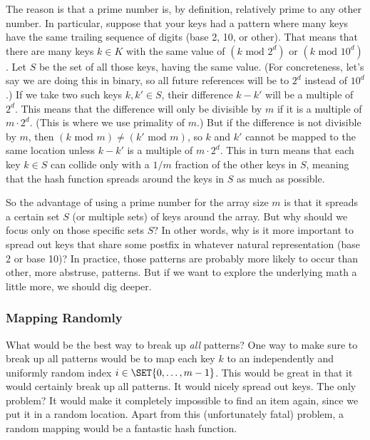 The reason is that a prime
number is, by definition, relatively prime to any other number. 
In particular, suppose that your keys had a pattern where many keys
have the same trailing sequence of digits (base 2, 10, or
other). That means that there are many keys $k \in K$ with the same
value of $(k \text{ mod } 2^d)$ or $(k \text{ mod } 10^d)$.
Let $S$ be the set of all those keys, having the same value.
(For concreteness, let's say we are doing this in binary, so all
future references will be to $2^d$ instead of $10^d$.)
If we take two such keys $k, k' \in S$, their difference $k-k'$ will
be a multiple of $2^d$. 
This means that the difference will only be divisible by $m$ if it is
a multiple of $m \cdot 2^d$. (This is where we use primality of $m$.)
But if the difference is not divisible by $m$, then 
$(k \text{ mod } m) \neq (k' \text{ mod } m)$, so $k$ and $k'$ cannot be
mapped to the same location unless $k - k'$ is a multiple of 
$m \cdot 2^d$. This in turn means that each key $k \in S$ can collide 
only with a $1/m$ fraction of the other keys in $S$, meaning that the
hash function spreads around the keys in $S$ as much as possible.

So the advantage of using a prime number for the array size $m$ is
that it spreads a certain set $S$ (or multiple sets) of keys around
the array. But why should we focus only on those specific sets $S$?
In other words, why is it more important to spread out keys that share
some postfix in whatever natural representation (base 2 or base 10)?
In practice, those patterns are probably more likely to occur than
other, more abstruse, patterns. But if we want to explore the
underlying math a little more, we should dig deeper.

\subsubsection{Mapping Randomly}
What would be the best way to break up \emph{all} patterns?
One way to make sure to break up all patterns would be to map 
each key $k$ to an independently and uniformly random index 
$i \in \SET{0, \ldots, m-1}$.  
This would be great in that it would certainly break up all patterns.
It would nicely spread out keys. The only problem? It would make it
completely impossible to find an item again, since we put it in a
random location. Apart from this (unfortunately fatal) problem, a
random mapping would be a fantastic hash function.

